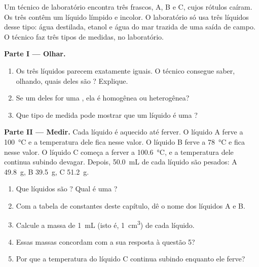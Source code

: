 \begin{problem}
\label{pb:g6:pure-substances-and-mixtures:1}
Um técnico de laboratório encontra três frascos, A, B e C, cujos rótulos
caíram. Os três contêm um líquido límpido e incolor. O laboratório só
usa três líquidos desse tipo: água destilada, etanol e água do mar
trazida de uma saída de campo. O técnico faz três tipos de medidas, no
laboratório.

\medskip
\noindent\textbf{Parte I --- Olhar.}
\begin{enumerate}
  \item Os três líquidos parecem exatamente iguais. O técnico consegue
        saber, olhando, quais deles são ? Explique.
  \item Se um deles for uma , ela é homogênea ou heterogênea?
  \item Que tipo de medida pode mostrar que um líquido é uma ?
\end{enumerate}

\medskip
\noindent\textbf{Parte II --- Medir.}
Cada líquido é aquecido até ferver. O líquido A ferve a
\qty{100}{\celsius} e a temperatura dele fica nesse valor. O líquido B
ferve a \qty{78}{\celsius} e fica nesse valor. O líquido C começa a
ferver a \qty{100.6}{\celsius}, e a temperatura dele continua subindo
devagar. Depois, \qty{50.0}{mL} de cada líquido são pesados: A
\qty{49.8}{g}, B \qty{39.5}{g}, C \qty{51.2}{g}.
\begin{enumerate}[resume]
  \item Que líquidos são ? Qual é uma ?
  \item Com a tabela de constantes deste capítulo, dê o nome dos
        líquidos A e B.
  \item Calcule a massa de \qty{1}{mL} (isto é, \qty{1}{cm^3}) de cada
        líquido.
  \item Essas massas concordam com a sua resposta à questão 5?
  \item Por que a temperatura do líquido C continua subindo enquanto ele
        ferve?
\end{enumerate}


\end{problem}
